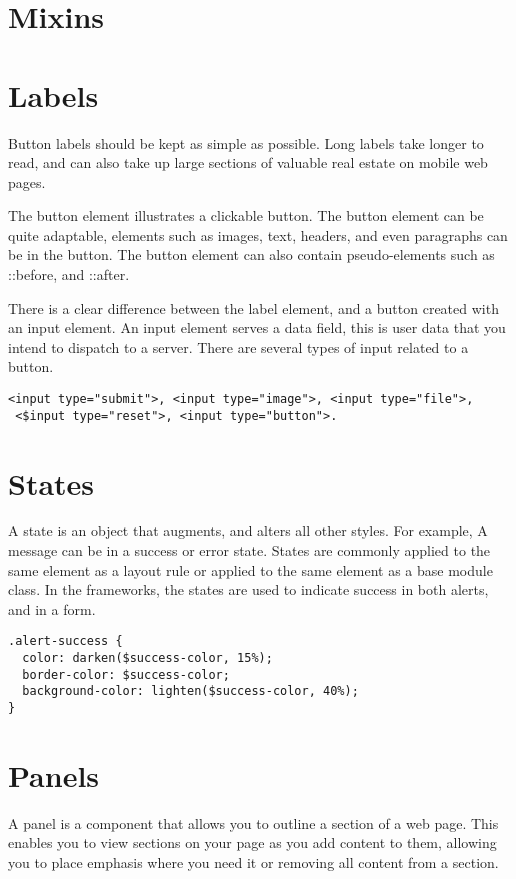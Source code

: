 \section*{Mixins}

\section*{Labels}
Button labels should be kept as simple as possible. Long labels take longer to read, and can also take up large sections of valuable real estate on mobile web pages. 

The button element illustrates a clickable button. The button element can be quite adaptable, elements such as images, text, headers, and even paragraphs can be in the button. The button element can also contain pseudo-elements such as ::before, and ::after. 

There is a clear difference between the label element, and a button created with an input element. An input element serves a data field, this is user data that you intend to dispatch to a server. There are several types of input related to a button.

\begin{lstlisting}[language=CSS3]
 <input type="submit">, <input type="image">, <input type="file">, 
 <$input type="reset">, <input type="button">. 
\end{lstlisting}

\section*{States}
A state is an object that augments, and alters all other styles. For example, A message can be in a success or error state. States are commonly applied to the same element as a layout rule or applied to the same element as a base module class. In the frameworks, the states are used to indicate success in both alerts, and in a form. 

\begin{lstlisting}[language=CSS3]
.alert-success {
  color: darken($success-color, 15%);
  border-color: $success-color;
  background-color: lighten($success-color, 40%);
}
\end{lstlisting}

\section*{Panels}
A panel is a component that allows you to outline a section of a web page. This enables you to view sections on your page as you add content to them, allowing you to place emphasis where you need it or removing all content from a section. 


